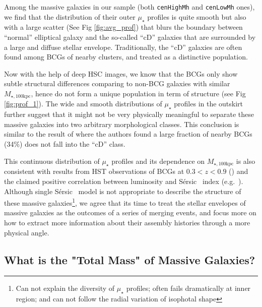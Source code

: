 \documentclass{emulateapj}
\def\ser{{S\'{e}rsic\ }}
\def\rbcg{\texttt{cenHighMh}}
\def\nbcg{\texttt{cenLowMh}}
\def\mtot{{$M_{\star,100\mathrm{kpc}}$}}
\def\mden{{$\mu_{\star}$}}
\begin{document}
\begin{CJK*}{UTF8}{gbsn}
    Among the massive galaxies in our sample (both \rbcg{} and \nbcg{} ones), we find that 
    the distribution of their outer \mden{} profiles is quite smooth but also with a large
    scatter (See Fig \ref{fig:avg_prof}) that blurs the boundary between ``normal'' 
    elliptical galaxy and the so-called ``cD'' galaxies that are surrounded by a large 
    and diffuse stellar envelope. 
    Traditionally, the ``cD'' galaxies are often found among BCGs of nearby clusters, 
    and treated as a distinctive population.  
    
    Now with the help of deep HSC images, we know that the BCGs only show subtle 
    structural differences comparing to non-BCG galaxies with similar \mtot{}, hence do 
    not form a unique population in term of structure (see Fig \ref{fig:prof_1}). 
    The wide and smooth distributions of \mden{} profiles in the outskirt further suggest 
    that it might not be very physically meaningful to separate these massive galaxies 
    into two arbitrary morphological classes. 
    This conclusion is similar to the result of \citep{Zhao2015} where the authors found 
    a large fraction of nearby BCGs (34\%) does not fall into the ``cD'' class.
    
    This continuous distribution of \mden{} profiles and its dependence on \mtot{} is 
    also consistent with results from HST observations of BCGs at $0.3 < z <0.9$ 
    (\citealt{Bai2014}) and the claimed positive correlation between luminosity and \ser 
    index (e.g.\ \citealt{Savorgnan13}). 
    Although single \ser{} model is not appropriate to describe the structure of these 
    massive galaxies\footnote{Can not explain the diversity of \mden{} profiles; often 
    fails dramatically at inner region; and can not follow the radial variation of 
    isophotal shape}, we agree that its time to treat the stellar envelopes of massive 
    galaxies as the outcomes of a series of merging events, and focus more on how to 
    extract more information about their assembly histories through a more physical 
    angle.    
    
 
\subsection{What is the "Total Mass" of Massive Galaxies?}
            

\end{CJK*}
\end{document}
